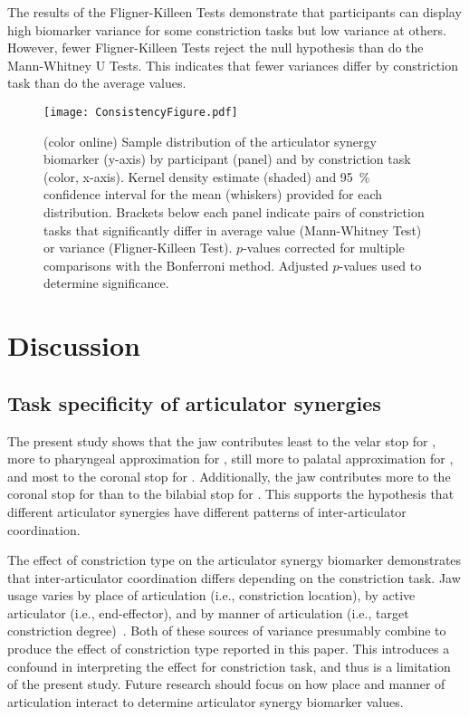 \documentclass[preprint]{JASAnew}\usepackage[]{graphicx}\usepackage[]{color}
\begin{document}
The results of the Fligner-Killeen Tests demonstrate that participants can display high biomarker variance for some constriction tasks but low variance at others. However, fewer Fligner-Killeen Tests reject the null hypothesis than do the Mann-Whitney U Tests. This indicates that fewer variances differ by constriction task than do the average values.

\begin{figure}

\texttt{[image: ConsistencyFigure.pdf]}

\caption{(color online) Sample distribution of the articulator synergy biomarker (y-axis) by participant (panel) and by constriction task (color, x-axis). Kernel density estimate (shaded) and \SI{95}{\percent} confidence interval for the mean (whiskers) provided for each distribution.
%
Brackets below each panel indicate pairs of constriction tasks that significantly differ in average value (Mann-Whitney Test) or variance (Fligner-Killeen Test). $p$-values corrected for multiple comparisons with the Bonferroni method. Adjusted $p$-values used to determine significance.}
\label{fig:consistency}
\end{figure}






\section{Discussion}
\label{sec:discussion}

\subsection{Task specificity of articulator synergies}

The present study shows that the jaw contributes 
least to the velar stop for \textipa{[k]},
more to pharyngeal approximation for \textipa{[A]}, 
still more to palatal approximation for \textipa{[i]},
and most to the coronal stop for \textipa{[t]}.
Additionally, the jaw contributes more to the coronal stop for \textipa{[t]} than to the bilabial stop for \textipa{[p]}.
%
This supports the hypothesis that different articulator synergies have different patterns of inter-articulator coordination.


The effect of constriction type on the articulator synergy biomarker demonstrates that inter-articulator coordination differs depending on the constriction task. Jaw usage varies by place of articulation (i.e., constriction location), by active articulator (i.e., end-effector), and by manner of articulation (i.e., target constriction degree)~\cite{vatikiotis1995analysis}. Both of these sources of variance presumably combine to produce the effect of constriction type reported in this paper. This introduces a confound in interpreting the effect for constriction task, and thus is a limitation of the present study. Future research should focus on how place and manner of articulation interact to determine articulator synergy biomarker values.
\end{document}
